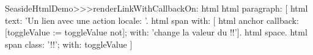 \begin{code}{}
SeasideHtmlDemo>>>renderLinkWithCallbackOn: html 
	html paragraph: [
		html text: 'Un lien avec une action locale: '.
		html span with: [
			html anchor
				callback: [toggleValue := toggleValue not];
				with: 'change la valeur du !!'].
		html space.
		html span
			class: '!!';
			with: toggleValue ]
\end{code}
